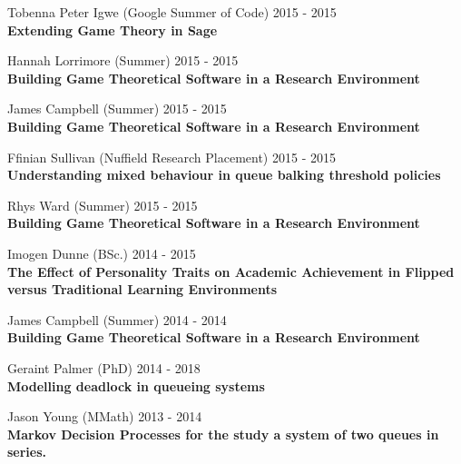 \documentclass[10pt]{res} %
\begin{document}
\begin{resume}
\begin{etaremune}
\item
    Tobenna Peter Igwe (Google Summer of Code) \hfill 2015 -
    2015\\
\textbf{Extending Game Theory in Sage}\\

\item
    Hannah Lorrimore (Summer) \hfill 2015 -
    2015\\
\textbf{Building Game Theoretical Software in a Research Environment}\\

\item
    James Campbell (Summer) \hfill 2015 -
    2015\\
\textbf{Building Game Theoretical Software in a Research Environment}\\

\item
    Ffinian Sullivan (Nuffield Research Placement) \hfill 2015 -
    2015\\
\textbf{Understanding mixed behaviour in queue balking threshold policies}\\

\item
    Rhys Ward (Summer) \hfill 2015 -
    2015\\
\textbf{Building Game Theoretical Software in a Research Environment}\\

\item
    Imogen Dunne (BSc.) \hfill 2014 -
    2015\\
\textbf{The Effect of Personality Traits on Academic Achievement in Flipped versus Traditional Learning Environments}\\

\item
    James Campbell (Summer) \hfill 2014 -
    2014\\
\textbf{Building Game Theoretical Software in a Research Environment}\\

\item
    Geraint Palmer (PhD) \hfill 2014 -
    2018\\
\textbf{Modelling deadlock in queueing systems}\\

\item
    Jason Young (MMath) \hfill 2013 -
    2014\\
\textbf{Markov Decision Processes for the study a system of two queues in series.}\\


\end{etaremune}
\end{resume}
\end{document}
